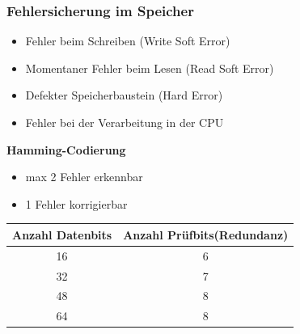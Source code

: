 \begin{minipage}{0.5\linewidth}
\subsubsection{Fehlersicherung im Speicher}
\begin{itemize}
    \item Fehler beim Schreiben (Write Soft Error)
    \item Momentaner Fehler beim Lesen (Read Soft Error)
    \item Defekter Speicherbaustein (Hard Error)
    \item Fehler bei der Verarbeitung in der CPU
\end{itemize}
\textbf{Hamming-Codierung}
\begin{itemize}
    \item max 2 Fehler erkennbar
    \item  1 Fehler korrigierbar
\end{itemize}
\renewcommand{\arraystretch}{0.8}
\begin{tabular}{|c|c|}
    \hline
    \textbf{Anzahl Datenbits}&\textbf{Anzahl Prüfbits}(Redundanz)\\ \hline
    16  & 6 \\ \hline
    32  & 7 \\ \hline
    48  & 8 \\ \hline
    64  & 8 \\ \hline
\end{tabular}
\renewcommand{\arraystretch}{1}
\end{minipage}


